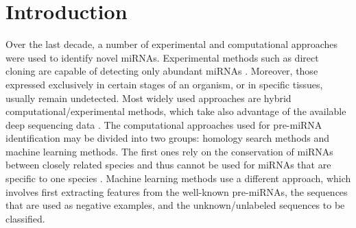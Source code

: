 \documentclass{article}
\begin{document}
\section{Introduction}
Over the last decade, a number of experimental and computational approaches were used to identify novel miRNAs. Experimental methods such as direct cloning are capable of detecting only abundant miRNAs \citep{kleftogiannis2013where}. Moreover, those expressed exclusively in certain stages of an organism, or in specific tissues, usually remain undetected. Most widely used approaches are hybrid computational/experimental methods, which take also advantage of the available deep sequencing data \citep{an2013mirdeep}.
The computational approaches used for pre-miRNA identification may be divided into two groups: homology search methods and machine learning methods. The first ones rely on the conservation of miRNAs between closely related species and thus cannot be used for miRNAs that are specific to one species \citep{ng2007novo}. Machine learning methods use a different approach, which involves first extracting features from the well-known pre-miRNAs, the sequences that are used as negative examples, and the unknown/unlabeled sequences to be classified.
\end{document}
